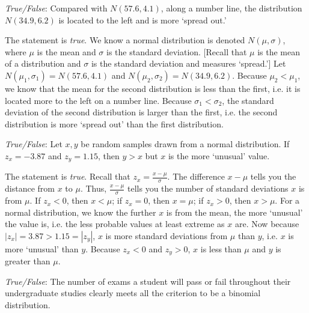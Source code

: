\documentclass[11pt,letterpaper]{article}
\begin{document}
\quizsol \textit{True/False}: Compared with $N(57.6, 4.1)$, along a number line, the distribution $N(34.9, 6.2)$ is located to the left and is more `spread out.' \pspace

\sol The statement is \textit{true}. We know a normal distribution is denoted $N(\mu, \sigma)$, where $\mu$ is the mean and $\sigma$ is the standard deviation. [Recall that $\mu$ is the mean of a distribution and $\sigma$ is the standard deviation and measures `spread.'] Let $N(\mu_1, \sigma_1)= N(57.6, 4.1)$ and $N(\mu_2, \sigma_2)= N(34.9, 6.2)$. Because $\mu_2 < \mu_1$, we know that the mean for the second distribution is less than the first, i.e. it is located more to the left on a number line. Because $\sigma_1 < \sigma_2$, the standard deviation of the second distribution is larger than the first, i.e. the second distribution is more `spread out' than the first distribution. \pvspace{1.3cm}



\quizsol \textit{True/False}: Let $x, y$ be random samples drawn from a normal distribution. If $z_x= -3.87$ and $z_y= 1.15$, then $y > x$ but $x$ is the more `unusual' value. \pspace

\sol The statement is \textit{true}. Recall that $z_x= \frac{x - \mu}{\sigma}$. The difference $x - \mu$ tells you the distance from $x$ to $\mu$. Thus, $\frac{x - \mu}{\sigma}$ tells you the number of standard deviations $x$ is from $\mu$. If $z_x < 0$, then $x < \mu$; if $z_x= 0$, then $x= \mu$; if $z_x > 0$, then $x > \mu$. For a normal distribution, we know the further $x$ is from the mean, the more `unusual' the value is, i.e. the less probable values at least extreme as $x$ are. Now because $|z_x|= 3.87 > 1.15= |z_y|$, $x$ is more standard deviations from $\mu$ than $y$, i.e. $x$ is more `unusual' than $y$. Because $z_x < 0$ and $z_y> 0$, $x$ is less than $\mu$ and $y$ is greater than $\mu$. \pvspace{1.3cm}



\quizsol \textit{True/False}: The number of exams a student will pass or fail throughout their undergraduate studies clearly meets all the criterion to be a binomial distribution. \pspace
\end{document}
